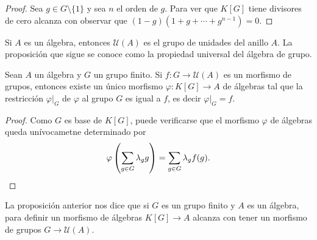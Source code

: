 \begin{proof}
Sea $g\in G\setminus\{1\}$ y sea $n$ el orden de $g$. Para ver que $K[G]$ tiene divisores
de cero alcanza con observar que 
$(1-g)(1+g+\cdots+g^{n-1})=0$. 
\end{proof}

Si $A$ es un álgebra, entonces $\mathcal{U}(A)$ es el grupo de unidades del anillo $A$. 
La proposición que sigue se conoce como la propiedad universal del álgebra de grupo.

\begin{proposition}
Sean $A$ un álgebra y $G$ un grupo finito. Si $f\colon G\to\mathcal{U}(A)$ es un morfismo de grupos, entonces
existe un único morfismo $\varphi\colon K[G]\to A$ de álgebras tal que la restricción
$\varphi|_G$ de $\varphi$ al grupo $G$ es igual a $f$, es decir 	$\varphi|_G=f$. 
\end{proposition}

\begin{proof}
Como $G$ es base de $K[G]$, puede verificarse que 
el morfismo $\varphi$ de álgebras 
queda unívocametne determinado por 
\[
\varphi\left(\sum_{g\in G}\lambda_gg\right)=\sum_{g\in G}\lambda_gf(g).\qedhere
\]	
\end{proof}

La proposición anterior nos dice que si $G$ es un grupo finito y $A$ es un álgebra, 
para definir un morfismo de álgebras $K[G]\to A$ 
alcanza con tener un morfismo de grupos $G\to\mathcal{U}(A)$.  

